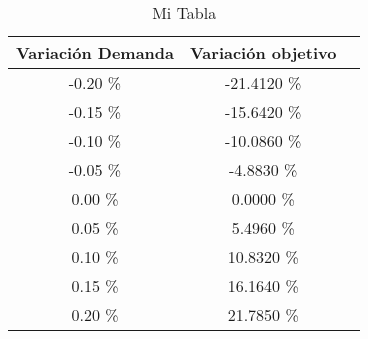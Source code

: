 \begin{table}
\centering
\begin{tabular}{|c|c|c|}
\hline
 Variación Demanda & Variación objetivo \\ \hline
-0.20 \% & -21.4120 \% \\ \hline
-0.15 \% & -15.6420 \% \\ \hline
-0.10 \% & -10.0860 \% \\ \hline
-0.05 \% & -4.8830 \% \\ \hline
0.00 \% & 0.0000 \% \\ \hline
0.05 \% & 5.4960 \% \\ \hline
0.10 \% & 10.8320 \% \\ \hline
0.15 \% & 16.1640 \% \\ \hline
0.20 \% & 21.7850 \% \\ \hline
\end{tabular}
\caption{Mi Tabla}
\end{table}
